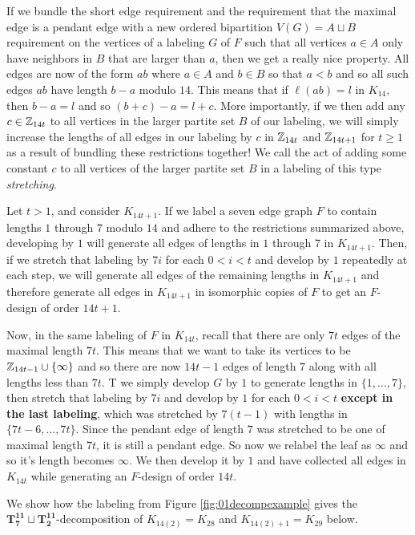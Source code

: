   If we bundle the short edge requirement and the requirement that the maximal edge is a pendant edge with a new ordered bipartition $V(G)=A\sqcup B$ requirement on the vertices of a labeling $G$ of $F$ such that all vertices $a\in A$ only have neighbors in $B$ that are larger than $a$, then we get a really nice property. All edges are now of the form $ab$ where $a\in A$ and $b\in B$ so that $a<b$ and so all such edges $ab$ have length $b-a$ modulo $14$. This means that if $\ell(ab)=l$ in $K_{14}$, then $b-a=l$ and so $(b+c)-a=l+c$. More importantly, if we then add any $c\in \mathbb{Z}_{14t}$ to all vertices in the larger partite set $B$ of our labeling, we will simply increase the lengths of all edges in our labeling by $c$ in $\mathbb{Z}_{14t}$ and $\mathbb{Z}_{14t+1}$ for $t\geq 1$ as a result of bundling these restrictions together! We call the act of adding some constant $c$ to all vertices of the larger partite set $B$ in a labeling of this type \textit{stretching}.

  Let $t>1$, and consider $K_{14t+1}$. If we label a seven edge graph $F$ to contain lengths $1$ through $7$ modulo $14$ and adhere to the restrictions summarized above, developing by $1$ will generate all edges of lengths in $1$ through $7$ in $K_{14t+1}$. Then, if we stretch that labeling by $7i$ for each $0<i<t$ and develop by $1$ repeatedly at each step, we will generate all edges of the remaining lengths in $K_{14t+1}$ and therefore generate all edges in $K_{14t+1}$ in isomorphic copies of $F$ to get an $F$-design of order $14t+1$. 
  
  Now, in the same labeling of $F$ in $K_{14t}$, recall that there are only $7t$ edges of the maximal length $7t$. This means that we want to take its vertices to be $\mathbb{Z}_{14t-1}\cup \{\infty\}$ and so there are now $14t-1$ edges of length $7$ along with all lengths less than $7t$. T we simply develop $G$ by $1$ to generate lengths in $\{1,\hdots,7\}$, then stretch that labeling by $7i$ and develop by $1$ for each $0<i<t$ \textbf{except in the last labeling}, which was stretched by $7(t-1)$ with lengths in $\{7t-6,\hdots,7t\}$. Since the pendant edge of length $7$ was stretched to be one of maximal length $7t$, it is still a pendant edge. So now we relabel the leaf as $\infty$ and so it's length becomes $\infty$. We then develop it by $1$ and have collected all edges in $K_{14t}$ while generating an $F$-design of order $14t$.

  We show how the labeling from Figure \ref{fig:01decompexample} gives the $\mathbf{T_{7}^{11}\sqcup T_{2}^{11}}$-decomposition of $K_{14(2)}=K_{28}$ and $K_{14(2)+1}=K_{29}$ below.

